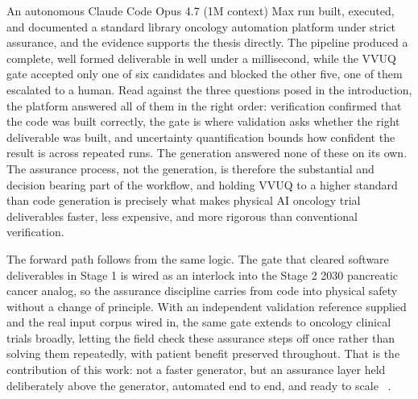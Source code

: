 
An autonomous Claude Code Opus 4.7 (1M context) Max run built, executed, and
documented a standard library oncology automation platform under strict
assurance, and the evidence supports the thesis directly. The pipeline produced a
complete, well formed deliverable in well under a millisecond, while the VVUQ
gate accepted only one of six candidates and blocked the other five, one of them
escalated to a human. Read against the three questions posed in the introduction,
the platform answered all of them in the right order: verification confirmed that
the code was built correctly, the gate is where validation asks whether the right
deliverable was built, and uncertainty quantification bounds how confident the
result is across repeated runs. The generation answered none of these on its own.
The assurance process, not the generation, is therefore the substantial and
decision bearing part of the workflow, and holding VVUQ to a higher standard than
code generation is precisely what makes physical AI oncology trial deliverables
faster, less expensive, and more rigorous than conventional verification.

The forward path follows from the same logic. The gate that cleared software
deliverables in Stage 1 is wired as an interlock into the Stage 2 2030 pancreatic
cancer analog, so the assurance discipline carries from code into physical safety
without a change of principle. With an independent validation reference supplied
and the real input corpus wired in, the same gate extends to oncology clinical
trials broadly, letting the field check these assurance steps off once rather
than solving them repeatedly, with patient benefit preserved throughout. That is
the contribution of this work: not a faster generator, but an assurance layer
held deliberately above the generator, automated end to end, and ready to scale
~\cite{repo-cancer-automated}.
